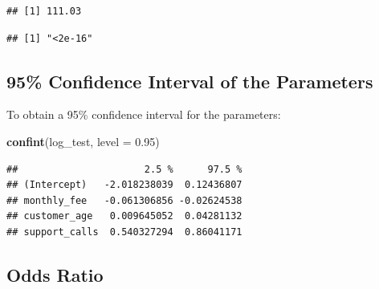 \documentclass[
]{article}
\newenvironment{Shaded}{\begin{snugshade}}{\end{snugshade}}
\newcommand{\AttributeTok}[1]{\textcolor[rgb]{0.13,0.29,0.53}{#1}}
\newcommand{\CommentTok}[1]{\textcolor[rgb]{0.56,0.35,0.01}{\textit{#1}}}
\newcommand{\DecValTok}[1]{\textcolor[rgb]{0.00,0.00,0.81}{#1}}
\newcommand{\FloatTok}[1]{\textcolor[rgb]{0.00,0.00,0.81}{#1}}
\newcommand{\FunctionTok}[1]{\textcolor[rgb]{0.13,0.29,0.53}{\textbf{#1}}}
\newcommand{\NormalTok}[1]{#1}
\newcommand{\OtherTok}[1]{\textcolor[rgb]{0.56,0.35,0.01}{#1}}
\newcommand{\SpecialCharTok}[1]{\textcolor[rgb]{0.81,0.36,0.00}{\textbf{#1}}}
\begin{document}
\begin{verbatim}
## [1] 111.03
\end{verbatim}

\begin{Shaded}
\end{Shaded}

\begin{verbatim}
## [1] "<2e-16"
\end{verbatim}

\subsection{95\% Confidence Interval of the
Parameters}\label{confidence-interval-of-the-parameters}

To obtain a 95\% confidence interval for the parameters:

\begin{Shaded}
\begin{Highlighting}[]
\FunctionTok{confint}\NormalTok{(log\_test, }\AttributeTok{level =} \FloatTok{0.95}\NormalTok{)}
\end{Highlighting}
\end{Shaded}

\begin{verbatim}
##                      2.5 %      97.5 %
## (Intercept)   -2.018238039  0.12436807
## monthly_fee   -0.061306856 -0.02624538
## customer_age   0.009645052  0.04281132
## support_calls  0.540327294  0.86041171
\end{verbatim}

\subsection{Odds Ratio}\label{odds-ratio}
\end{document}
